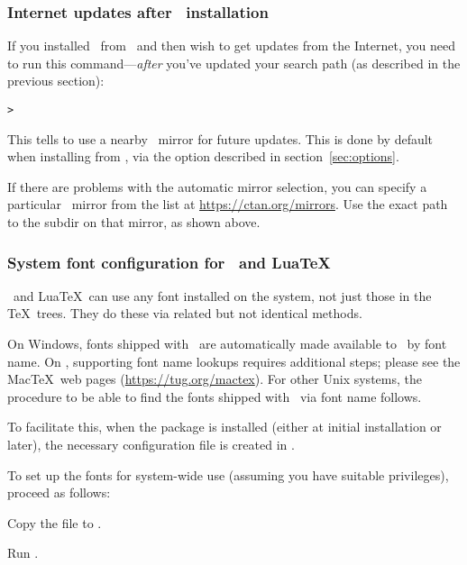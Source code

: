 \documentclass{article}
\begin{document}
\subsubsection{Internet updates after \DVD\ installation}
\label{sec:dvd-install-net-updates}

If you installed \TL\ from \DVD\ and then wish to get updates from the
Internet, you need to run this command---\emph{after} you've updated
your search path (as described in the previous section):

\begin{alltt}
> 
\end{alltt}

This tells  to use a nearby \CTAN\ mirror for future updates.
This is done by default when installing from \DVD, via the option
described in section~\ref{sec:options}.

If there are problems with the automatic mirror selection, you can
specify a particular \CTAN\ mirror from the list at
\url{https://ctan.org/mirrors}.  Use the exact path to the
 subdir on that mirror, as shown above.


\subsubsection{System font configuration for \protect\XeTeX\protect\ and Lua\protect\TeX}
\label{sec:font-conf-sys}

\XeTeX\ and Lua\TeX\ can use any font installed on the system, not just
those in the \TeX\ trees.  They do these via related but not identical
methods.

On Windows, fonts shipped with \TL\ are automatically made available to
\XeTeX\ by font name.  On \MacOSX, supporting font name lookups requires
additional steps; please see the Mac\TeX\ web pages
(\url{https://tug.org/mactex}).  For other Unix systems, the procedure to
be able to find the fonts shipped with \TL\ via font name follows.

To facilitate this, when the  package is installed
(either at initial installation or later), the necessary configuration
file is created in
.

To set up the \TL{} fonts for system-wide use (assuming you have
suitable privileges), proceed as follows:
\begin{enumerate*}
\item Copy the  file to
.
\item Run .
\end{enumerate*}
\end{document}

